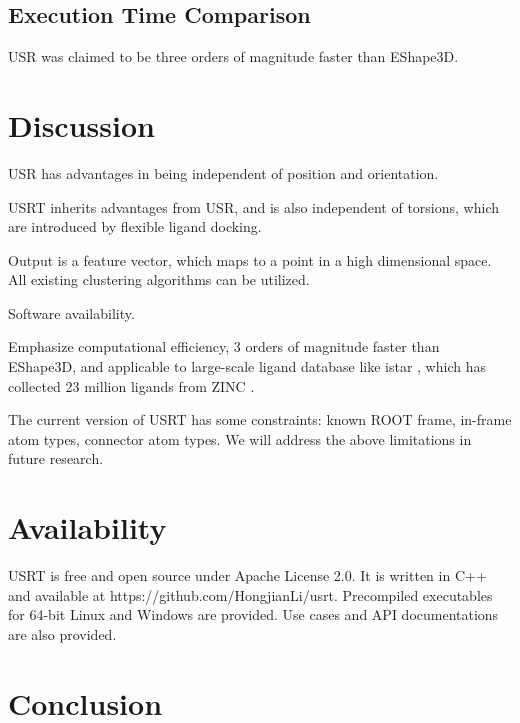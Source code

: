 \documentclass[twocolumn]{svjour3}          %
\begin{document}
\subsection{Execution Time Comparison}

USR was claimed to be three orders of magnitude faster than EShape3D.

\section{Discussion}



USR has advantages in being independent of position and orientation.

USRT inherits advantages from USR, and is also independent of torsions, which are introduced by flexible ligand docking.

Output is a feature vector, which maps to a point in a high dimensional space. All existing clustering algorithms can be utilized.

Software availability.

Emphasize computational efficiency, 3 orders of magnitude faster than EShape3D, and applicable to large-scale ligand database like istar \cite{1362}, which has collected 23 million ligands from ZINC \cite{532,1178}.

The current version of USRT has some constraints: known ROOT frame, in-frame atom types, connector atom types. We will address the above limitations in future research.

\section{Availability}

USRT is free and open source under Apache License 2.0. It is written in C++ and available at https://github.com/HongjianLi/usrt. Precompiled executables for 64-bit Linux and Windows are provided. Use cases and API documentations are also provided.

\section{Conclusion}
\end{document}
